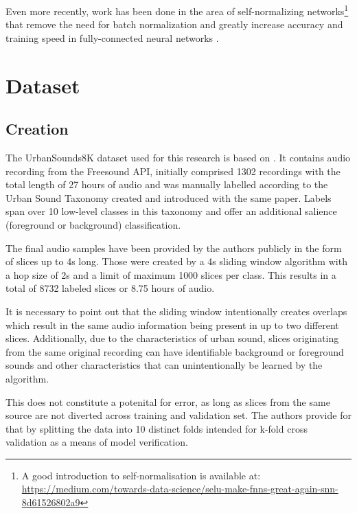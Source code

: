 Even more recently, work has been done in the area of self-normalizing networks\footnote{A good introduction to self-normalisation is available at: \url{https://medium.com/towards-data-science/selu-make-fnns-great-again-snn-8d61526802a9}} that remove the need for batch normalization and greatly increase accuracy and training speed in fully-connected neural networks \cite{DBLP:journals/corr/KlambauerUMH17}.

\chapter{Dataset}

\section{Creation}

The UrbanSounds8K dataset used for this research is based on \cite{Salamon:UrbanSound:ACMMM:14}. It contains audio recording from the Freesound API, initially comprised 1302 recordings with the total length of 27 hours of audio and was manually labelled according to the Urban Sound Taxonomy created and introduced with the same paper. Labels span over 10 low-level classes in this taxonomy and offer an additional salience (foreground or background) classification.

The final audio samples have been provided by the authors publicly in the form of slices up to 4s long. Those were created by a 4s sliding window algorithm with a hop size of 2s and a limit of maximum 1000 slices per class. This results in a total of 8732 labeled slices or 8.75 hours of audio.

It is necessary to point out that the sliding window intentionally creates overlaps which result in the same audio information being present in up to two different slices. Additionally, due to the characteristics of urban sound, slices originating from the same original recording can have identifiable background or foreground sounds and other characteristics that can unintentionally be learned by the algorithm. %

 This does not constitute a potenital for error, as long as 
  slices from the same source are not diverted across training and validation set. The authors provide for that by splitting the data into 10 distinct folds intended for k-fold cross validation as a means of model verification.



